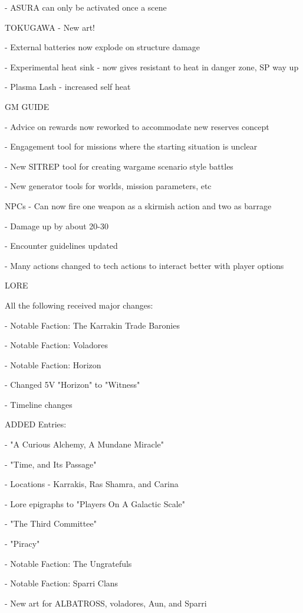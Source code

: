     -    ASURA can only be activated once a scene


TOKUGAWA
    -    New art!

    -    External batteries now explode on structure damage

    -    Experimental heat sink - now gives resistant to heat in danger zone, SP way up


    -    Plasma Lash - increased self heat


GM GUIDE




     -    Advice on rewards now reworked to accommodate new reserves concept


     -    Engagement tool for missions where the starting situation is unclear

     -    New SITREP tool for creating wargame scenario style battles

     -    New generator tools for worlds, mission parameters, etc


NPCs
     -    Can now fire one weapon as a skirmish action and two as barrage


     -    Damage up by about 20-30%

     -    Encounter guidelines updated


     -    Many actions changed to tech actions to interact better with player options


LORE

All the following received major changes:

     -    Notable Faction: The Karrakin Trade Baronies


     -    Notable Faction: Voladores

     -    Notable Faction: Horizon

     -    Changed 5V "Horizon" to "Witness"


     -    Timeline changes


ADDED Entries:

     -    "A Curious Alchemy, A Mundane Miracle"

     -    "Time, and Its Passage"

     -    Locations - Karrakis, Ras Shamra, and Carina


     -    Lore epigraphs to "Players On A Galactic Scale"

     -    "The Third Committee"

     -    "Piracy"


     -    Notable Faction: The Ungratefuls

     -    Notable Faction: Sparri Clans

     -    New art for ALBATROSS, voladores, Aun, and Sparri



